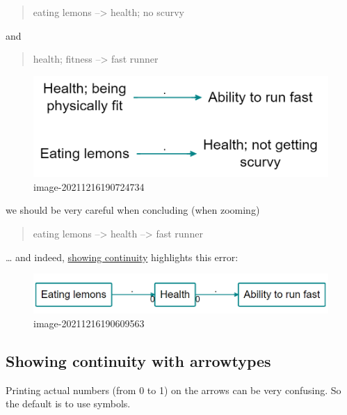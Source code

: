 \documentclass[
]{book}
\begin{document}
\begin{quote}
eating lemons --\textgreater{} health; no scurvy
\end{quote}

and

\begin{quote}
health; fitness --\textgreater{} fast runner
\end{quote}

\begin{figure}
\centering
\includegraphics[width=6.77083in,height=\textheight]{_assets/image-20211216190724734.png}
\caption{image-20211216190724734}
\end{figure}

we should be very careful when concluding (when zooming)

\begin{quote}
eating lemons --\textgreater{} health --\textgreater{} fast runner
\end{quote}

\ldots{} and indeed, \href{https://causalmap.shinyapps.io/CM2test/?s=416}{showing continuity} highlights this error:

\begin{figure}
\centering
\includegraphics[width=6.77083in,height=\textheight]{_assets/image-20211216190609563.png}
\caption{image-20211216190609563}
\end{figure}

\hypertarget{showing-continuity-with-arrowtypes}{%
\subsection{Showing continuity with arrowtypes}\label{showing-continuity-with-arrowtypes}}

Printing actual numbers (from 0 to 1) on the arrows can be very confusing. So the default is to use symbols.
\end{document}
